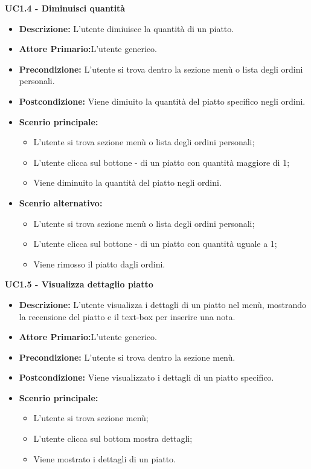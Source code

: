 \textbf{UC1.4 - Diminuisci quantità}
\begin{itemize}
    \item \textbf{Descrizione:} L'utente dimiuisce la quantità di un piatto.
    \item \textbf{Attore Primario:}L'utente generico.
    \item \textbf{Precondizione:} L'utente si trova dentro la sezione menù o lista degli ordini personali.
    \item \textbf{Postcondizione:} Viene dimiuito la quantità del piatto specifico negli ordini.
    \item \textbf{Scenrio principale:}
    \begin{itemize}
        \item L'utente si trova sezione menù o lista degli ordini personali;
        \item L'utente clicca sul bottone - di un piatto con quantità maggiore di 1;
        \item Viene diminuito la quantità del piatto negli ordini.
    \end{itemize}
    \item \textbf{Scenrio alternativo:}
    \begin{itemize}
        \item L'utente si trova sezione menù o lista degli ordini personali;
        \item L'utente clicca sul bottone - di un piatto con quantità uguale a 1;
        \item Viene rimosso il piatto dagli ordini.
    \end{itemize}
\end{itemize}
\textbf{UC1.5 - Visualizza dettaglio piatto}
\begin{itemize}
    \item \textbf{Descrizione:} L'utente visualizza i dettagli di un piatto nel menù, mostrando la recensione del piatto e il text-box per inserire una nota.
    \item \textbf{Attore Primario:}L'utente generico.
    \item \textbf{Precondizione:} L'utente si trova dentro la sezione menù.
    \item \textbf{Postcondizione:} Viene visualizzato i dettagli di un piatto specifico.
    \item \textbf{Scenrio principale:}  
    \begin{itemize}
        \item L'utente si trova sezione menù;
        \item L'utente clicca sul bottom mostra dettagli;
        \item Viene mostrato i dettagli di un piatto.
    \end{itemize}
\end{itemize}

